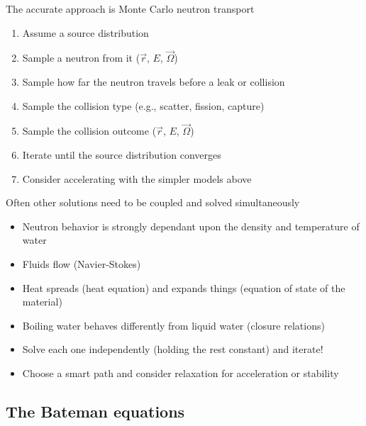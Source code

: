 \documentclass{beamer}
\begin{document}
        \begin{frame}{The accurate approach is Monte Carlo neutron transport}
            \begin{enumerate}
                \item Assume a source distribution
                \pause
                \item Sample a neutron from it ($\vec r$, $E$, $\vec\Omega$)
                \pause
                \item Sample how far the neutron travels before a leak or collision
                \pause
                \item Sample the collision type (e.g., scatter, fission, capture)
                \pause
                \item Sample the collision outcome ($\vec r$, $E$, $\vec\Omega$)
                \pause
                \item Iterate until the source distribution converges
                \pause
                \item Consider accelerating with the simpler models above
            \end{enumerate}
        \end{frame}

        \begin{frame}{Often other solutions need to be coupled and solved simultaneously}
            \begin{itemize}
                \item Neutron behavior is strongly dependant upon the density and temperature of water
                \pause
                \item Fluids flow (Navier-Stokes)
                \pause
                \item Heat spreads (heat equation) and expands things (equation of state of the material)
                \pause
                \item Boiling water behaves differently from liquid water (closure relations)
                \pause
                \item Solve each one independently (holding the rest constant) and iterate!
                \pause
                \item Choose a smart path and consider relaxation for acceleration or stability
            \end{itemize}
        \end{frame}

    \subsection{The Bateman equations}
\end{document}
